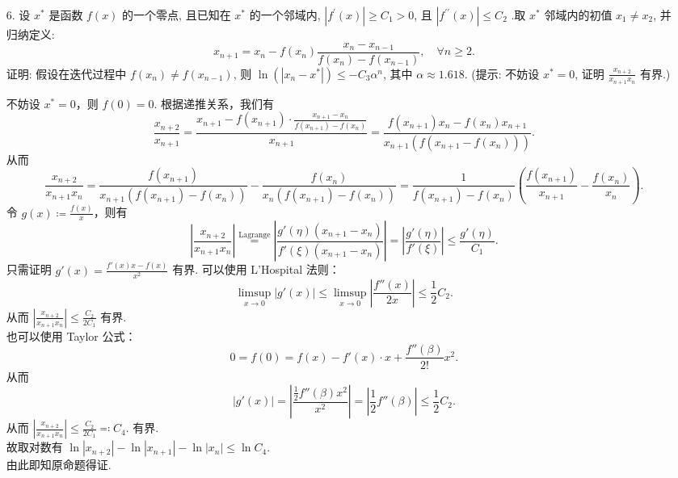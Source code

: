 \begin{enumerate}
    \item[6.]设 $x^{*}$ 是函数 $f(x)$ 的一个零点, 且已知在 $x^{*}$ 的一个邻域内, $\displaystyle|f^{\prime}(x)|\geq C_{1} > 0$,
    且 $\displaystyle|f^{\prime \prime}(x)|\leq C_{2}$ .取 $x^{*}$ 邻域内的初值 $x_{1}\neq x_{2}$, 并归纳定义:
    \[\displaystyle x_{n + 1} = x_{n} - f(x_{n})\frac{x_{n} - x_{n - 1}}{f(x_{n}) - f(x_{n - 1})},\quad \forall n\geq 2.\]
    证明: 假设在迭代过程中 $\displaystyle f(x_n) \neq f(x_{n-1})$, 则 $\displaystyle\ln(|x_n - x^*|) \leq -C_3 \alpha^n$, 其中 $\alpha \approx 1.618$. 
    (提示: 不妨设 $x^* = 0$, 证明 $\displaystyle\frac{x_{n+2}}{x_{n+1}x_n}$ 有界.)
    \begin{solution}
        不妨设 $x^*=0$，则 $f(0)=0$. 根据递推关系，我们有
        \[
            \frac{x_{n+2}}{x_{n+1}}=\frac{x_{n+1}-f(x_{n+1})\cdot\frac{x_{n+1}-x_n}{f(x_{n+1})-f(x_n)}}{x_{n+1}}=\frac{f(x_{n+1})x_n-f(x_n)x_{n+1}}{x_{n+1}(f(x_{n+1}-f(x_n)))}.
        \]
        从而
        \[
            \frac{x_{n+2}}{x_{n+1}x_n}=\frac{f(x_{n+1})}{x_{n+1}(f(x_{n+1})-f(x_n))}-\frac{f(x_{n})}{x_{n}(f(x_{n+1})-f(x_n))}=\frac{1}{f(x_{n+1})-f(x_n)}\left( \frac{f(x_{n+1})}{x_{n+1}}-\frac{f(x_n)}{x_n} \right).
        \]
        令 $\displaystyle g(x)\coloneqq\frac{f(x)}{x}$，则有
        \[
            \left| \frac{x_{n+2}}{x_{n+1}x_n} \right|\overset{\mathrm{Lagrange}}{=}\left| \frac{g'(\eta)(x_{n+1}-x_n)}{f'(\xi)(x_{n+1}-x_n)} \right|=\left| \frac{g'(\eta)}{f'(\xi)} \right|\leq \frac{g'(\eta)}{C_1}.
        \]
        只需证明 $\displaystyle g'(x)=\frac{f'(x)x-f(x)}{x^2}$ 有界. 
        可以使用 L'Hospital 法则：
        \[
            \limsup_{x\to 0}\left| g'(x) \right|\leq\limsup_{x\to0}\left| \frac{f''(x)}{2x} \right|\leq\frac{1}{2}C_2.
        \]
        从而 $\displaystyle \left| \frac{x_{n+2}}{x_{n+1}x_n} \right|\leq\frac{C_2}{2C_1}$ 有界.\\
        也可以使用 Taylor 公式：
        \[
            0=f(0)=f(x)-f'(x)\cdot x+\frac{f''(\beta)}{2!}x^2.
        \]
        从而
        \[
            \left| g'(x) \right| = \left| \frac{\frac{1}{2}f''(\beta)x^2}{x^2} \right| = \left| \frac{1}{2}f''(\beta)\right| \leq \frac{1}{2}C_2.
        \]
        从而 $\displaystyle \left| \frac{x_{n+2}}{x_{n+1}x_n} \right|\leq\frac{C_2}{2C_1}\eqqcolon C_4.$ 有界.\\
        故取对数有 $\displaystyle \ln\left| x_{n+2} \right|-\ln\left| x_{n+1} \right|-\ln\left| x_{n} \right|\leq \ln{C_4}$. \\
        由此即知原命题得证.
    \end{solution}
\end{enumerate}

